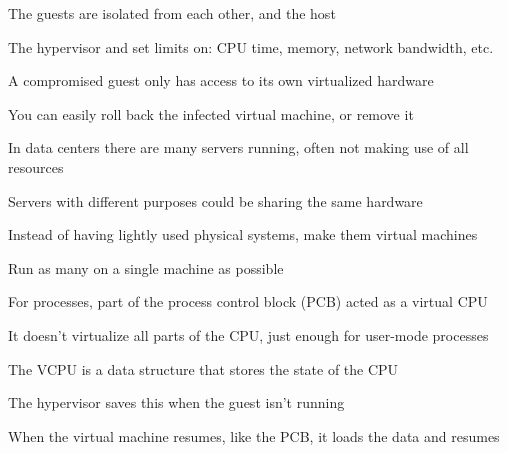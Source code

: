   \begin{slide}


    The guests are isolated from each other, and the host
    \medskip

    The hypervisor and set limits on: CPU time, memory, network bandwidth, etc.

    \leftspace{}A compromised guest only has access to its own virtualized
                 hardware
    \medskip

    You can easily roll back the infected virtual machine, or remove it

  \end{slide}

  \begin{slide}
    

    In data centers there are many servers running, often not making use of all
    resources

    \leftspace{}Servers with different purposes could be sharing the same
                 hardware
    \medskip

    Instead of having lightly used physical systems, make them virtual machines

    \leftspace{}Run as many on a single machine as possible

  \end{slide}

  \begin{slide}


    For processes, part of the process control block (PCB) acted as a virtual
    CPU

    \leftspace{}It doesn't virtualize all parts of the CPU, just enough for
                 user-mode processes
    \medskip

    The VCPU is a data structure that stores the state of the CPU

    \leftspace{}The hypervisor saves this when the guest isn't running
    \medskip

    When the virtual machine resumes, like the PCB, it loads the data and
    resumes

  \end{slide}

